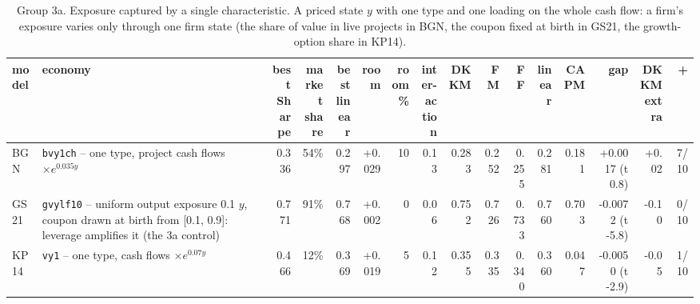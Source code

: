 \begin{table}[htbp]\centering\footnotesize\setlength{\tabcolsep}{2pt}
\caption{Group 3a. Exposure captured by a single characteristic. A priced state $y$ with one type and one loading on the whole cash flow: a firm's exposure varies only through one firm state (the share of value in live projects in BGN, the coupon fixed at birth in GS21, the growth-option share in KP14).}\label{tab:g3a}
\begin{adjustbox}{max width=\textwidth}\begin{tabular}{l>{\raggedright\arraybackslash}p{3.6cm}rrrrrrrrrrrrrr}\hline
model & economy & \shortstack[r]{best\\Sharpe} & \shortstack[r]{market\\share} & \shortstack[r]{best\\linear} & room & \shortstack[r]{room\\\%} & \shortstack[r]{inter-\\action} & DKKM & FM & FF & linear & CAPM & gap & \shortstack[r]{DKKM\\extra} & + \\\hline
BGN & \texttt{bvy1ch} -- one type, project cash flows $\times e^{0.035y}$ & 0.336 & 54\% & 0.297 & +0.029 & 10 & 0.13 & 0.283 & 0.252 & 0.255 & 0.281 & 0.181 & +0.0017 (t 0.8) & +0.02 & 7/10 \\
GS21 & \texttt{gvylf10} -- uniform output exposure 0.1 $y$, coupon drawn at birth from [0.1, 0.9]: leverage amplifies it (the 3a control) & 0.771 & 91\% & 0.768 & +0.002 & 0 & 0.06 & 0.752 & 0.726 & 0.733 & 0.760 & 0.703 & -0.0072 (t -5.8) & -0.10 & 0/10 \\
KP14 & \texttt{vy1} -- one type, cash flows $\times e^{0.07y}$ & 0.466 & 12\% & 0.369 & +0.019 & 5 & 0.12 & 0.355 & 0.335 & 0.340 & 0.360 & 0.047 & -0.0050 (t -2.9) & -0.05 & 1/10 \\
\hline\end{tabular}\end{adjustbox}\end{table}
